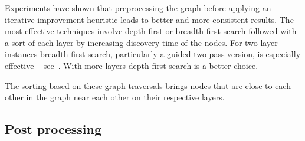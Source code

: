 Experiments have shown that preprocessing the graph before applying an iterative improvement heuristic leads to better and more consistent results.
The most effective techniques involve depth-first or breadth-first search
followed with a sort of each layer by increasing discovery time of the nodes.
For two-layer instances breadth-first search, particularly a guided two-pass version, is especially effective -- see~\cite{2001-JEA-Stallmann}.
With more layers depth-first search is a better choice.

The sorting based on these graph traversals brings nodes that are close to each other in the graph near each other on their respective layers.

\subsection{Post processing}

